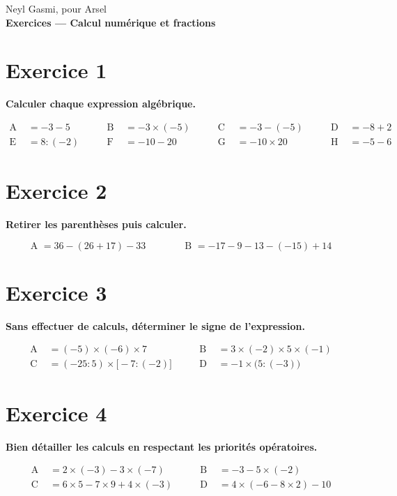 \documentclass[a4paper,11pt]{article}
\begin{document}
Neyl Gasmi, pour Arsel\\
{\Large \textbf{Exercices — Calcul numérique et fractions}}\par\medskip


\section*{Exercice 1}
\textbf{Calculer chaque expression algébrique.}

\[
\begin{aligned}
\text{A }&= -3-5
&\qquad \text{B }&= -3\times(-5)
&\qquad \text{C }&= -3-(-5)
&\qquad \text{D }&= -8+2\\[2pt]
\text{E }&= 8:(-2)
&\qquad \text{F }&= -10-20
&\qquad \text{G }&= -10\times 20
&\qquad \text{H }&= -5-6
\end{aligned}
\]


\section*{Exercice 2}
\textbf{Retirer les parenthèses puis calculer.}

\[
\text{A }= 36-(26+17)-33
\qquad\qquad
\text{B }= -17-9-13-(-15)+14
\]


\section*{Exercice 3}
\textbf{Sans effectuer de calculs, déterminer le signe de l'expression.}

\[
\begin{aligned}
\text{A }&= (-5)\times(-6)\times 7
&\qquad
\text{B }&= 3\times(-2)\times 5\times(-1)\\[2pt]
\text{C }&= (-25:5)\times\bigl[-7:(-2)\bigr]
&\qquad
\text{D }&= -1\times\bigl(5:(-3)\bigr)
\end{aligned}
\]


\section*{Exercice 4}
\textbf{Bien détailler les calculs en respectant les priorités opératoires.}

\[
\begin{aligned}
\text{A }&= 2\times(-3)-3\times(-7)
&\qquad
\text{B }&= -3-5\times(-2)\\[2pt]
\text{C }&= 6\times 5 - 7\times 9 + 4\times(-3)
&\qquad
\text{D }&= 4\times(-6-8\times 2)-10
\end{aligned}
\]
\end{document}
